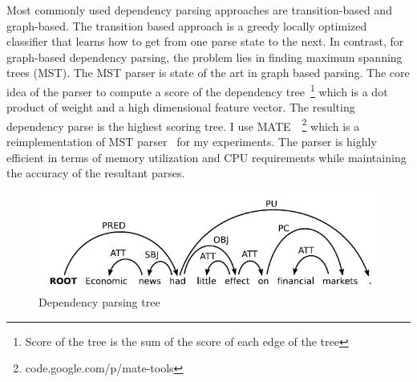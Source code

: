 Most commonly used dependency parsing approaches are transition-based and graph-based. The transition based approach is a greedy locally optimized classifier that learns how to get from one parse state to the next. %
In contrast, for graph-based dependency parsing, the problem lies in finding maximum spanning trees (MST). The MST parser is state of the art in graph based parsing. The core idea of the parser to compute a score of the dependency tree~\footnote{Score of the tree is the sum of the score of each edge of the tree} which is a dot product of weight and a high dimensional feature vector. %
The resulting dependency parse is the highest scoring tree. I use MATE~\cite{bohnet2010very}~\footnote{code.google.com/p/mate-tools} which is a reimplementation of MST parser~\cite{McDonald:2005:NDP:1220575.1220641} for my experiments. %
The parser is highly efficient in terms of memory utilization and CPU requirements while maintaining the accuracy of the resultant parses.

\begin{figure}[!htb]
    \centering
    \includegraphics[scale = 0.6]{figures/dep-tree.png}
    \centering
    \caption{Dependency parsing tree~\cite{kubler2009dependency}}
    \label{fig:depParsetree}
\end{figure}

